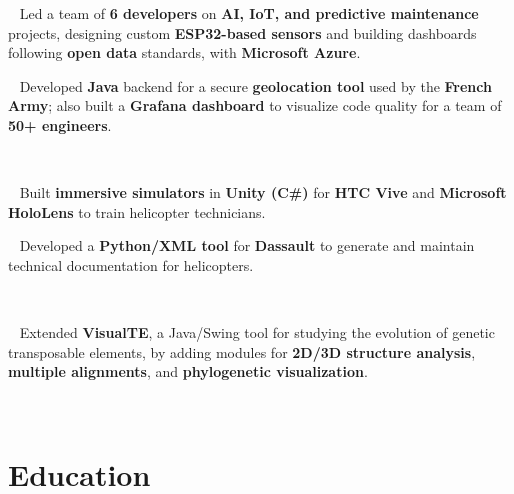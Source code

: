 \documentclass{muratcan_cv}
\renewcommand{\explanationdetail}[1]{%
    \indent \indent \begin{minipage}{0.87\linewidth} \scriptsize #1 \end{minipage} \\[0.03cm]
}
\begin{document}
%
\explanationdetail{
    \smallskip
    \ %
    Led a team of \textbf{6 developers} on \textbf{AI, IoT, and predictive maintenance} projects, designing custom \textbf{ESP32-based sensors} and building dashboards following \textbf{open data} standards, with \textbf{Microsoft Azure}.

    \smallskip
    \coloredbullet\ %
    Developed \textbf{Java} backend for a secure \textbf{geolocation tool} used by the \textbf{French Army}; also built a \textbf{Grafana dashboard} to visualize code quality for a team of \textbf{50+ engineers}.
}
%
\explanationdetail{
    \smallskip
    \ %
    Built \textbf{immersive simulators} in \textbf{Unity (C\#)} for \textbf{HTC Vive} and \textbf{Microsoft HoloLens} to train helicopter technicians.

    \smallskip
    \coloredbullet\ %
    Developed a \textbf{Python/XML tool} for \textbf{Dassault} to generate and maintain technical documentation for helicopters.
}
%
\explanationdetail{
    \ %
    Extended \textbf{VisualTE}, a Java/Swing tool for studying the evolution of genetic transposable elements, by adding modules for \textbf{2D/3D structure analysis}, \textbf{multiple alignments}, and \textbf{phylogenetic visualization}.
}
\vspace{0.2ex}
\section{Education}
\vspace{-0.5ex}
\end{document}
